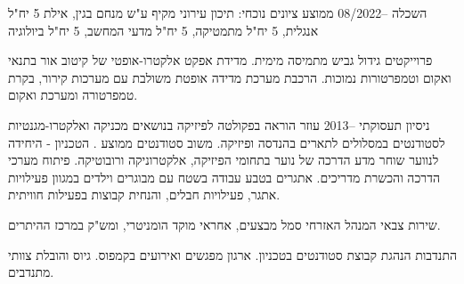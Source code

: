 \documentclass[english,hebrew,12pt,a4paper]{article}
\begin{document}
\thispagestyle{empty}
	{}
	{}
\begin{cvsection}{השכלה}
%
		{\technion}
		{--08/2022\endL}
		{ממוצע ציונים נוכחי: }
%
		{תיכון עירוני מקיף ע"ש מנחם בגין, אילת}
		{}
		{5 יח"ל אנגלית, 5 יח"ל מתמטיקה, 5 יח"ל מדעי המחשב, 5 יח"ל ביולוגיה}
%	
\end{cvsection}
\begin{cvsection}{פרוייקטים}
		{\technion}
		{}
		{
		}
		{\technion}
		{}
		{
		גידול גביש  מתמיסה מימית.
		מדידת אפקט אלקטרו-אופטי של קיטוב אור בתנאי ואקום וטמפרטורות נמוכות.
		הרכבת מערכת מדידה אופטת משולבת עם מערכות קירור, בקרת טמפרטורה ומערכת ואקום.
		}
\end{cvsection}
\begin{cvsection}{ניסיון תעסוקתי}
		{\technion}
		{--2013\endL}
		{
		עוזר הוראה בפקולטה לפיזיקה בנושאים מכניקה ואלקטרו-מגנטיות לסטודנטים במסלולים לתארים בהנדסה ופיזיקה.
		משוב סטודנטים ממוצע .
		}
		{הטכניון - היחידה לנווער שוחר מדע}
		{}
		{
		הדרכה של נוער בתחומי הפיזיקה, אלקטרוניקה ורובוטיקה. פיתוח מערכי הדרכה והכשרת מדריכים.
		}
		{אתגרים בטבע}
		{}
		{עבודה בשטח עם מבוגרים וילדים במגוון פעילויות אתגר, פעילויות חבלים, והנחית קבוצות בפעילות
		חוויתית.}
\end{cvsection}
\begin{cvsection}{שירות צבאי}
		{המנהל האזרחי}
		{}
		{
		סמל מבצעים, אחראי מוקד הומניטרי, ומש"ק במרכז ההיתרים.
		}
\end{cvsection}
\begin{cvsection}{התנדבות}
		{\technion}
		{}
		{הנהגת קבוצת סטודנטים
		בטכניון. ארגון מפגשים ואירועים בקמפוס. גיוס והובלת צוותי מתנדבים.}
\end{cvsection}
\end{document}
